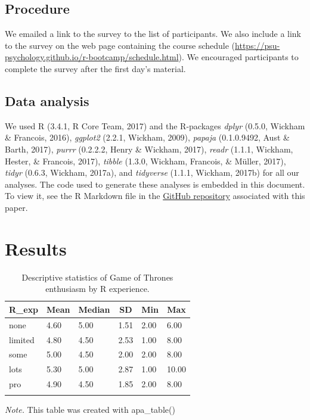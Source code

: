 \documentclass[english,man]{apa6}
\theoremstyle{definition}
\theoremstyle{definition}
\theoremstyle{remark}
\begin{document}
\subsection{Procedure}\label{procedure}

We emailed a link to the survey to the list of participants. We also
include a link to the survey on the web page containing the course
schedule
(\url{https://psu-psychology.github.io/r-bootcamp/schedule.html}). We
encouraged participants to complete the survey after the first day's
material.

\subsection{Data analysis}\label{data-analysis}

We used R (3.4.1, R Core Team, 2017) and the R-packages \emph{dplyr}
(0.5.0, Wickham \& Francois, 2016), \emph{ggplot2} (2.2.1, Wickham,
2009), \emph{papaja} (0.1.0.9492, Aust \& Barth, 2017), \emph{purrr}
(0.2.2.2, Henry \& Wickham, 2017), \emph{readr} (1.1.1, Wickham, Hester,
\& Francois, 2017), \emph{tibble} (1.3.0, Wickham, Francois, \& Müller,
2017), \emph{tidyr} (0.6.3, Wickham, 2017a), and \emph{tidyverse}
(1.1.1, Wickham, 2017b) for all our analyses. The code used to generate
these analyses is embedded in this document. To view it, see the R
Markdown file in the
\href{http://github.com/psu-psychology/r-bootcamp/papaja-demo/}{GitHub
repository} associated with this paper.

\section{Results}\label{results}

\begin{table}[tbp]
\begin{center}
\begin{threeparttable}
\caption{\label{tab:GoT-by-experience}Descriptive statistics of Game of Thrones enthusiasm by R experience.}
\begin{tabular}{llllll}
\toprule
R\_exp & \multicolumn{1}{c}{Mean} & \multicolumn{1}{c}{Median} & \multicolumn{1}{c}{SD} & \multicolumn{1}{c}{Min} & \multicolumn{1}{c}{Max}\\
\midrule
none & 4.60 & 5.00 & 1.51 & 2.00 & 6.00\\
limited & 4.80 & 4.50 & 2.53 & 1.00 & 8.00\\
some & 5.00 & 4.50 & 2.00 & 2.00 & 8.00\\
lots & 5.30 & 5.00 & 2.87 & 1.00 & 10.00\\
pro & 4.90 & 4.50 & 1.85 & 2.00 & 8.00\\
\bottomrule
\addlinespace
\end{tabular}
\begin{tablenotes}[para]
\textit{Note.} This table was created with apa\_table()
\end{tablenotes}
\end{threeparttable}
\end{center}
\end{table}
\end{document}
